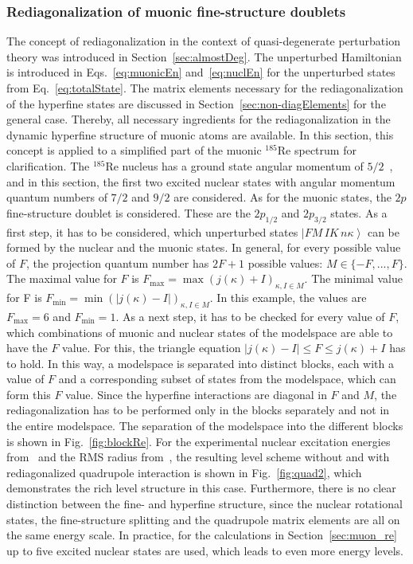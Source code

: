 \subsubsection{Rediagonalization of muonic fine-structure doublets}
\label{sec:toyModelRediag}
The concept of rediagonalization in the context of quasi-degenerate perturbation theory was introduced in Section~\ref{sec:almostDeg}. The unperturbed Hamiltonian is introduced in Eqs.~\eqref{eq:muonicEn} and~\eqref{eq:nuclEn} for the unperturbed states from Eq.~\eqref{eq:totalState}. The matrix elements necessary for the rediagonalization of the hyperfine states are discussed in Section~\ref{sec:non-diagElements} for the general case. Thereby, all necessary ingredients for the rediagonalization in the dynamic hyperfine structure of muonic atoms are available. In this section, this concept is applied to a simplified part of the muonic $^{185}$Re spectrum for clarification. The $^{185}$Re nucleus has a ground state angular momentum of $5/2$~\cite{Stone2005}, and in this section, the first two excited nuclear states with angular momentum quantum numbers of $7/2$ and $9/2$ are considered. As for the muonic states, the $2p$ fine-structure doublet is considered. These are the $2p_{1/2}$ and $2p_{3/2}$ states.
As a first step, it has to be considered, which unperturbed states $\left|FM\,IK\,n\kappa\right>$ can be formed by the nuclear and the muonic states. In general, for every possible value of $F$, the projection quantum number has $2F+1$ possible values: $M\in \{-F,...,F\}$. The maximal value for $F$ is $F_{\text{max}}=\max(j(\kappa)+I)_{\kappa, I \in M}$. The minimal value for F is $F_{\text{min}}=\min(|j(\kappa)-I|)_{\kappa, I \in M}$. In this example, the values are $F_{\text{max}}=6$ and $F_{\text{min}}=1$. As a next step, it has to be checked for every value of $F$, which combinations of muonic and nuclear states of the modelspace are able to have the $F$ value. For this, the triangle equation $|j(\kappa)-I|\leq F \leq j(\kappa)+I$ has to hold. In this way, a modelspace is separated into distinct blocks, each with a value of $F$ and a corresponding subset of states from the modelspace, which can form this $F$ value. Since the hyperfine interactions are diagonal in $F$ and $M$, the rediagonalization has to be performed only in the blocks separately and not in the entire modelspace. The separation of the modelspace into the different blocks is shown in Fig.~\ref{fig:blockRe}. For the experimental nuclear excitation energies from~\cite{ENSDF} and the RMS radius from~\cite{Angeli2013}, the resulting level scheme without and with rediagonalized quadrupole interaction is shown in Fig.~\ref{fig:quad2}, which demonstrates the rich level structure in this case. Furthermore, there is no clear distinction between the fine- and hyperfine structure, since the nuclear rotational states, the fine-structure splitting and the quadrupole matrix elements are all on the same energy scale. In practice, for the calculations in Section~\ref{sec:muon_re} up to five excited nuclear states are used, which leads to even more energy levels.

